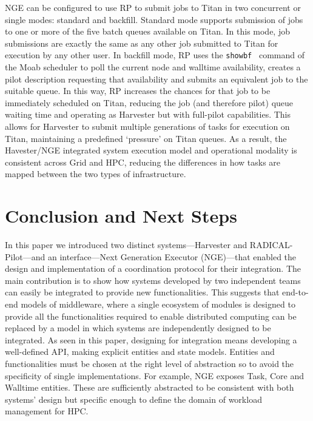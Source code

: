 \documentclass{webofc}
\begin{document}
NGE can be configured to use RP to submit jobs to Titan in two concurrent or
single modes: standard and backfill. Standard mode supports submission of
jobs to one or more of the five batch queues available on Titan. In this
mode, job submissions are exactly the same as any other job submitted to
Titan for execution by any other user. In backfill mode, RP uses the
\texttt{showbf}~\citep{showbf} command of the Moab scheduler to poll the
current node and walltime availability, creates a pilot description
requesting that availability and submits an equivalent job to the suitable
queue. In this way, RP increases the chances for that job to be immediately
scheduled on Titan, reducing the job (and therefore pilot) queue waiting time
and operating as Harvester but with full-pilot capabilities. This allows for
Harvester to submit multiple generations of tasks for execution on Titan,
maintaining a predefined ‘pressure’ on Titan queues. As a result, the
Havester/NGE integrated system execution model and operational modality is
consistent across Grid and HPC, reducing the differences in how tasks are
mapped between the two types of infrastructure.


\section{Conclusion and Next Steps}

In this paper we introduced two distinct systems---Harvester and
RADICAL-Pilot---and an interface---Next Generation Executor (NGE)---that
enabled the design and implementation of a coordination protocol for their
integration. The main contribution is to show how systems developed by two
independent teams can easily be integrated to provide new functionalities.
This suggests that end-to-end models of middleware, where a single ecosystem
of modules is designed to provide all the functionalities required to enable
distributed computing can be replaced by a model in which systems are
independently designed to be integrated. As seen in this paper, designing for
integration means developing a well-defined API, making explicit entities and
state models. Entities and functionalities must be chosen at the right level
of abstraction so to avoid the specificity of single implementations. For
example, NGE exposes Task, Core and Walltime entities. These are sufficiently
abstracted to be consistent with both systems’ design but specific enough to
define the domain of workload management for HPC.
\end{document}

